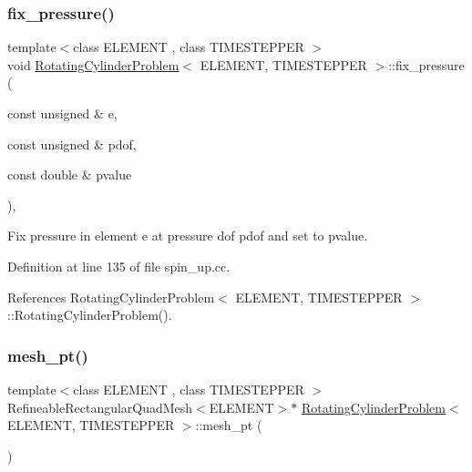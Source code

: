 \subsubsection{\texorpdfstring{fix\+\_\+pressure()}{fix\_pressure()}}
{\footnotesize\ttfamily template$<$class E\+L\+E\+M\+E\+NT , class T\+I\+M\+E\+S\+T\+E\+P\+P\+ER $>$ \\
void \hyperlink{classRotatingCylinderProblem}{Rotating\+Cylinder\+Problem}$<$ E\+L\+E\+M\+E\+NT, T\+I\+M\+E\+S\+T\+E\+P\+P\+ER $>$\+::fix\+\_\+pressure (\begin{DoxyParamCaption}\item[{const unsigned \&}]{e,  }\item[{const unsigned \&}]{pdof,  }\item[{const double \&}]{pvalue }\end{DoxyParamCaption})\hspace{0.3cm}{\ttfamily [inline]}, {\ttfamily [private]}}



Fix pressure in element e at pressure dof pdof and set to pvalue. 



Definition at line 135 of file spin\+\_\+up.\+cc.



References Rotating\+Cylinder\+Problem$<$ E\+L\+E\+M\+E\+N\+T, T\+I\+M\+E\+S\+T\+E\+P\+P\+E\+R $>$\+::\+Rotating\+Cylinder\+Problem().

\mbox{\label{classRotatingCylinderProblem_a49ac12439c31baa10b6a014a8161f78e}} 
\subsubsection{\texorpdfstring{mesh\+\_\+pt()}{mesh\_pt()}}
{\footnotesize\ttfamily template$<$class E\+L\+E\+M\+E\+NT , class T\+I\+M\+E\+S\+T\+E\+P\+P\+ER $>$ \\
Refineable\+Rectangular\+Quad\+Mesh$<$E\+L\+E\+M\+E\+NT$>$$\ast$ \hyperlink{classRotatingCylinderProblem}{Rotating\+Cylinder\+Problem}$<$ E\+L\+E\+M\+E\+NT, T\+I\+M\+E\+S\+T\+E\+P\+P\+ER $>$\+::mesh\+\_\+pt (\begin{DoxyParamCaption}{ }\end{DoxyParamCaption})\hspace{0.3cm}{\ttfamily [inline]}}



